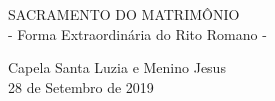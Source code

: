 SACRAMENTO DO MATRIMÔNIO
\\ - Forma Extraordinária do Rito Romano -


\begin{flushleft}
Capela Santa Luzia e Menino Jesus
\\ 28 de Setembro de 2019
\end{flushleft}